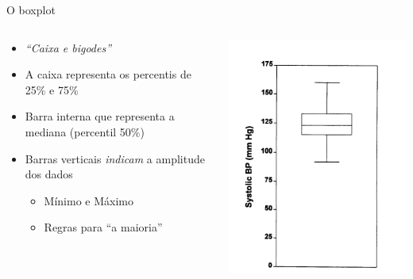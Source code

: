 \documentclass{beamer}
\begin{document}
\begin{frame}{O boxplot}
  \begin{columns}
    \begin{column}{7cm}
      \begin{itemize}
      \item {\em ``Caixa e bigodes''}
      \item A caixa representa os percentis de 25\% e 75\%
      \item Barra interna que representa a mediana (percentil 50\%)
      \item Barras verticais {\em indicam} a amplitude dos dados
        \begin{itemize}
        \item Mínimo e Máximo
        \item Regras para ``a maioria''
        \end{itemize}
      \end{itemize}
      \end{column}
      \begin{column}{5cm}
          \includegraphics[height=\textheight]{Cap3/boxplot}
      \end{column}
  \end{columns}
\end{frame}
\end{document}
